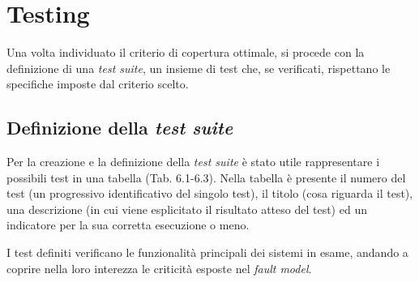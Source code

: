\chapter{Testing}

Una volta individuato il criterio di copertura ottimale, si procede con la definizione di una \emph{test suite}, un insieme di test che, se verificati, rispettano le specifiche imposte dal criterio scelto.

\section{Definizione della \emph{test suite}}

Per la creazione e la definizione della \emph{test suite} è stato utile rappresentare i possibili test in una tabella (Tab. 6.1-6.3). Nella tabella è presente il numero del test (un progressivo identificativo del singolo test), il titolo (cosa riguarda il test), una descrizione (in cui viene esplicitato il risultato atteso del test) ed un indicatore per la sua corretta esecuzione o meno.

I test definiti verificano le funzionalità principali dei sistemi in esame, andando a coprire nella loro interezza le criticità esposte nel \emph{fault model}.

